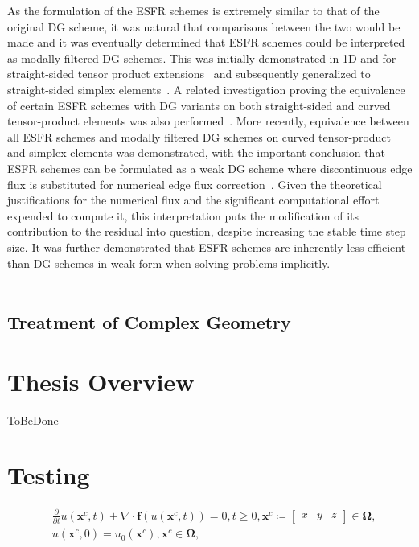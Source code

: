 \documentclass[12pt,Bold,letterpaper,TexShade]{mcgilletdclass}
\numberwithin{equation}{section}
\begin{document}
As the formulation of the ESFR schemes is extremely similar to that of the original DG scheme, it was natural that comparisons between the two would be made and it was eventually determined that ESFR schemes could be interpreted as modally filtered DG schemes. This was initially demonstrated in 1D and for straight-sided tensor product extensions~\cite{allaneau2011} and subsequently generalized to straight-sided simplex elements~\cite{williams2014a}. A related investigation proving the equivalence of certain ESFR schemes with DG variants on both straight-sided and curved tensor-product elements was also performed~\cite{degrazia2014,mengaldo2015}. More recently, equivalence between all ESFR schemes and modally filtered DG schemes on curved tensor-product and simplex elements was demonstrated, with the important conclusion that ESFR schemes can be formulated as a weak DG scheme where discontinuous edge flux is substituted for numerical edge flux correction~\cite{zwanenburg2016}. Given the theoretical justifications for the numerical flux and the significant computational effort expended to compute it, this interpretation puts the modification of its contribution to the residual into question, despite increasing the stable time step size. It was further demonstrated that ESFR schemes are inherently less efficient than DG schemes in weak form when solving problems implicitly.
\\~

\subsection{Treatment of Complex Geometry}

\section{Thesis Overview}
{\color{red} ToBeDone}

\section{Testing}


\begin{equation} \nonumber
\begin{split}
& \frac{\partial}{\partial t} u(\boldsymbol x^{c},t) + \nabla \cdot \boldsymbol f(u(\boldsymbol x^{c},t)) = 0, t \ge 0, 
\boldsymbol x^{c} \coloneqq
\begin{bmatrix} x & y & z \end{bmatrix} \in \boldsymbol \Omega, \\
& u(\boldsymbol x^{c},0) = u_0(\boldsymbol x^{c}), \boldsymbol x^{c} \in \boldsymbol \Omega,
\end{split}
\end{equation}
\end{document}
